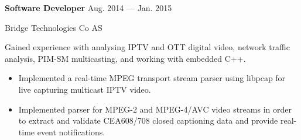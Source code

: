 \parbox[t][][t]{\linewidth}{
	\parbox{\linewidth}{\textbf{Software Developer}
		\hfill {{Aug. 2014 --- Jan. 2015}}}
		\smallbreak
	\parbox{\linewidth}{Bridge Technologies Co AS}

	\bigskip

	Gained experience with analysing IPTV and OTT digital video, network traffic analysis,
	PIM-SM multicasting, and working with embedded C++.

	\bigskip
	\begin{itemize}
		\item{Implemented a real-time MPEG transport stream parser using libpcap for live capturing
			multicast IPTV video.}\\[-.6em]
		\item{Implemented parser for MPEG-2 and MPEG-4/AVC video streams in order to extract and
			validate CEA608/708 closed captioning data and provide real-time event notifications.}

	\end{itemize}
	\bigskip
	\bigskip
}


